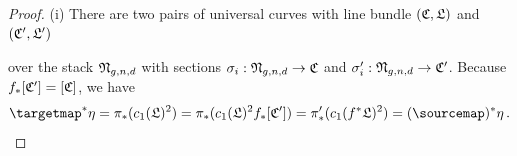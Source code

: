 \documentclass[a4paper,12pt]{article} %
\theoremstyle{definition}
\theoremstyle{plain}%
\newcommand{\Picabs}{\mathfrak{Pic}}
\newcommand{\jocomment}[1]{}
\begin{document}
\begin{proof} 

\noindent(i) There are two pairs of universal curves with line bundle $(\frak C,\frak L)$ and $(\frak C', \frak L')$
\begin{center}
\end{center}
over the stack $\frak{N}_{g,n,d}$ with sections $\sigma_i:\frak N_{g,n,d}\to\frak C$ and $\sigma_i':\frak N_{g,n,d}\to \frak C'$. Because $f_*[\frak C'] = [\frak C]$, we have
\[
\targetmap^*\eta = \pi_*(c_1(\frak L)^2) = \pi_*(c_1(\frak L)^2f_*[\frak C']) = \pi'_*(c_1(f^*\frak L)^2) = (\sourcemap)^*\eta\, .
\]


\end{proof}
\end{document}

